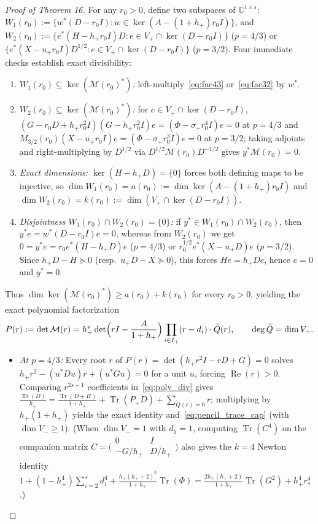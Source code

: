 \documentclass[10pt,letterpaper]{article}
\newcommand{\C}{\mathbb{C}}
\newcommand{\Tr}{\operatorname{Tr}}
\begin{document}
\begin{proof}[Proof of Theorem 16]
For any $r_0 > 0$, define two subspaces of $\C^{1\times s}$: $W_1(r_0) := \{w^*(D - r_0 I) : w \in \ker(A - (1+h_+)r_0 I)\}$, and $W_2(r_0) := \{e^*(H - h_+ r_0 I)D : e \in V_+ \cap \ker(D - r_0 I)\}$ ($p = 4/3$) or $\{e^*(X - u_+ r_0 I)D^{1/2} : e \in V_+ \cap \ker(D - r_0 I)\}$ ($p = 3/2$). Four immediate checks establish exact divisibility:
\begin{enumerate}[leftmargin=1.6em,itemsep=1.5pt]
  \item \emph{$W_1(r_0) \subseteq \ker(\mathcal{M}(r_0)^*)$:} left-multiply~\eqref{eq:fac43} or~\eqref{eq:fac32} by $w^*$.
  \item \emph{$W_2(r_0) \subseteq \ker(\mathcal{M}(r_0)^*)$:} for $e \in V_+ \cap \ker(D - r_0 I)$, $(G - r_0 D + h_+ r_0^2 I)(G - h_+ r_0^2 I)e = (\Phi - \sigma_+ r_0^4 I)e = 0$ at $p = 4/3$ and $M_{3/2}(r_0)(X - u_+ r_0 I)e = (\Phi - \sigma_+ r_0^3 I)e = 0$ at $p = 3/2$; taking adjoints and right-multiplying by $D^{1/2}$ via $D^{1/2}\mathcal{M}(r_0)D^{-1/2}$ gives $y^*\mathcal{M}(r_0) = 0$.
  \item \emph{Exact dimensions:} $\ker(H - h_+ D) = \{0\}$ forces both defining maps to be injective, so $\dim W_1(r_0) = a(r_0) := \dim\ker(A - (1+h_+)r_0 I)$ and $\dim W_2(r_0) = k(r_0) := \dim(V_+ \cap \ker(D - r_0 I))$.
  \item \emph{Disjointness $W_1(r_0) \cap W_2(r_0) = \{0\}$:} if $y^* \in W_1(r_0) \cap W_2(r_0)$, then $y^* e = w^*(D - r_0 I)e = 0$, whereas from $W_2(r_0)$ we get $0 = y^* e = r_0 e^*(H - h_+ D)e$ ($p=4/3$) or $r_0^{1/2} e^*(X - u_+ D)e$ ($p=3/2$). Since $h_+ D - H \succeq 0$ (resp.\ $u_+ D - X \succeq 0$), this forces $H e = h_+ D e$, hence $e = 0$ and $y^* = 0$.
\end{enumerate}
Thus $\dim\ker(\mathcal{M}(r_0)^*) \ge a(r_0) + k(r_0)$ for every $r_0 > 0$, yielding the exact polynomial factorization
\begin{equation}\label{eq:poly_div}
  P(r) := \det\mathcal{M}(r) = h_+^s \det\Bigl(rI - \frac{A}{1+h_+}\Bigr)\prod_{i \in I_+}(r - d_i)\cdot \widetilde{Q}(r),
  \qquad \deg \widetilde{Q} = \dim V_-.
\end{equation}
\begin{itemize}[leftmargin=1.5em,itemsep=1.5pt]
  \item \emph{At $p = 4/3$:} Every root $r$ of $P(r) = \det(h_+ r^2 I - rD + G) = 0$ solves $h_+ r^2 - (u^* Du)r + (u^* Gu) = 0$ for a unit $u$, forcing $\operatorname{Re}(r) > 0$. Comparing $r^{2s-1}$ coefficients in~\eqref{eq:poly_div} gives $\frac{\Tr(D)}{h_+} = \frac{\Tr(D+H)}{1+h_+} + \Tr(P_+ D) + \sum_{\widetilde{Q}(r)=0} r$; multiplying by $h_+(1+h_+)$ yields the exact identity and~\eqref{eq:pencil_trace_cap} (with $\dim V_- \ge 1$). (When $\dim V_- = 1$ with $d_1 = 1$, computing $\Tr(C^4)$ on the companion matrix $C = \bigl(\begin{smallmatrix} 0 & I \\ -G/h_+ & D/h_+ \end{smallmatrix}\bigr)$ also gives the $k = 4$ Newton identity $1 + (1-h_+^4)\sum_{i=2}^s d_i^4 + \frac{h_+(h_++2)^2}{1+h_+}\Tr(\Phi) = \frac{2h_+(h_++2)}{1+h_+}\Tr(G^2) + h_+^4 r_*^4$.)

\end{itemize}
\end{proof}
\end{document}
